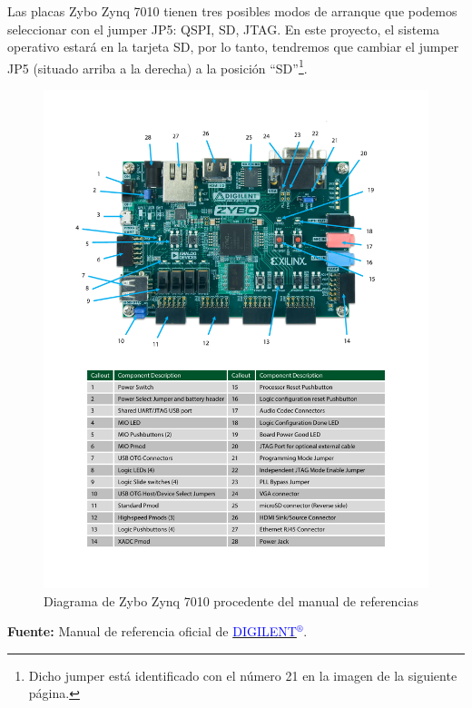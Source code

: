 Las placas Zybo Zynq 7010 tienen tres posibles modos de arranque que podemos seleccionar con el jumper JP5: QSPI, SD, JTAG. En este proyecto, el sistema operativo estará en la tarjeta SD, por lo tanto, tendremos que cambiar el jumper JP5 (situado arriba a la derecha) a la posición ``SD''\footnote{Dicho jumper está identificado con el número 21 en la imagen de la siguiente página.}.

\newpage
\begin{figure}[h]
	\centering
	\includegraphics[scale=0.69]{Anexos/Anexo2/Infraestructura/Datasheet.pdf}
	\caption{Diagrama de Zybo Zynq 7010 procedente del manual de referencias}
	\label{Diagrama de Zybo Zynq 7010 procedente del manual de referencias}
\end{figure}
\begin{center}
	\textbf{Fuente:} Manual de referencia oficial de \href{https://reference.digilentinc.com/_media/zybo:zybo_rm.pdf}{\textcolor{blue}{DIGILENT$^{\circledR}$}}.
\end{center}

